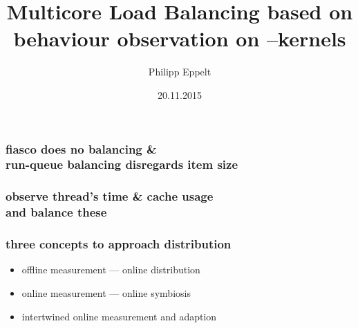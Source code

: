 \documentclass[utf8,10pt]{beamer}
\title[]{Multicore Load Balancing based on behaviour observation on \textmu--kernels}
\author{Philipp Eppelt}
\date{20.11.2015}
\begin{document}
\maketitle

\large

\newcommand{\ft}[1]{\frametitle{\hfill #1}}


\begin{frame}
  \frametitle{fiasco does no balancing \& \\ run-queue balancing disregards
  item size}
  \centering
  \begin{minipage}[l]{.49\columnwidth}
    
  \end{minipage}
  \begin{minipage}[r]{.49\columnwidth}
    
  \end{minipage}
\end{frame}


\begin{frame}
  \frametitle{observe thread's time \& cache usage \\ and balance these}
  \centering
  \begin{minipage}[l]{.49\columnwidth}
    
  \end{minipage}
  \begin{minipage}[r]{.49\columnwidth}
    
  \end{minipage}
\end{frame}



\begin{frame}
  \frametitle{three concepts to approach distribution}
  \begin{itemize}
    \item offline measurement --- online distribution
    \item online measurement --- online symbiosis
       
    \item intertwined online measurement and adaption
       
  \end{itemize}
\end{frame}
\end{document}

